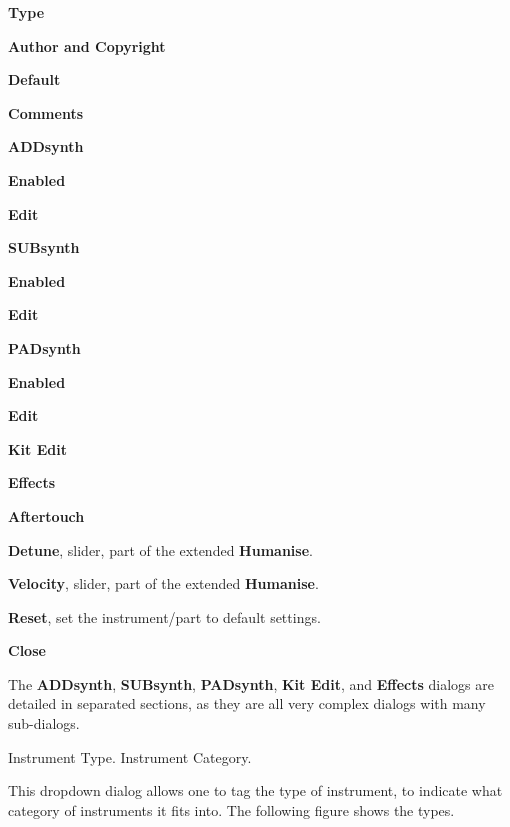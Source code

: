    \begin{enumber}
      \item \textbf{Type}
      \item \textbf{Author and Copyright}
      \item \textbf{Default}
      \item \textbf{Comments}
      \item \textbf{ADDsynth}
      \begin{enumber}
         \item \textbf{Enabled}
         \item \textbf{Edit}
      \end{enumber}
      \item \textbf{SUBsynth}
      \begin{enumber}
         \item \textbf{Enabled}
         \item \textbf{Edit}
      \end{enumber}
      \item \textbf{PADsynth}
      \begin{enumber}
         \item \textbf{Enabled}
         \item \textbf{Edit}
      \end{enumber}
      \item \textbf{Kit Edit}
      \item \textbf{Effects}
      \item \textbf{Aftertouch}
      \item \textbf{Detune}, slider, part of the extended \textbf{Humanise}.
      \item \textbf{Velocity}, slider, part of the extended \textbf{Humanise}.
      \item \textbf{Reset}, set the instrument/part to default settings.
      \item \textbf{Close}
   \end{enumber}

   The \textbf{ADDsynth}, \textbf{SUBsynth}, \textbf{PADsynth},
   \textbf{Kit Edit}, and \textbf{Effects}
   dialogs are detailed in separated sections, as they are all
   very complex dialogs with many sub-dialogs.

   \setcounter{ItemCounter}{0}      %

   Instrument Type.
   Instrument Category.

   This dropdown dialog allows one to tag the type of instrument, to
   indicate what category of instruments it fits into.
   The following figure shows the types.

